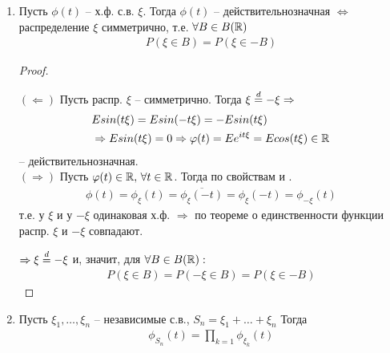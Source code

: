 \begin{enumerate}[label=\protect\circled{\arabic*},series=charfunc_properties]
    \begin{proof}
      \begin{align*}
        \phi(t) = E e^{i t \xi} = E e^{conj{-i t \xi}} = \conj{E e^{-i t \xi}} = \conj{\phi(-t)}
      \end{align*}
    \end{proof}

  \item
    Пусть $\phi(t)$ -- х.ф. с.в. $\xi$. 
    Тогда $\phi(t)$ -- действительнозначная $\Leftrightarrow$ распределение $\xi$ 
    симметрично, т.е. $\forall B \in B(\mathbb{R})$
    \begin{align*}
      P(\xi \in B) = P(\xi \in -B)
    \end{align*}

    \begin{proof}~

      $(\Leftarrow)$ Пусть распр. $\xi$ -- симметрично. 
      Тогда $\xi \stackrel{d}{=} -\xi \Rightarrow$
      \begin{align*}
        &E sin(t\xi) = E sin(-t\xi) = -E sin(t\xi)\\
        &\Rightarrow E sin(t\xi) = 0 \Rightarrow \varphi(t) = E e^{i t \xi} = E cos(t \xi) \in \mathbb{R}
      \end{align*}
      -- действительнозначная.\\

      $(\Rightarrow)$ Пусть $\varphi(t) \in \mathbb{R}, \, \forall t \in \mathbb{R}$.
      Тогда по свойствам  и .
      \begin{align*}
        \phi(t) = \phi_\xi (t) = \overline{\phi_\xi (-t)} = \phi_{\xi} (-t) = \phi_{-\xi} (t)
      \end{align*}
      т.е. у $\xi$ и у $-\xi$  одинаковая х.ф. 
      $\Rightarrow$ по теореме о единственности функции распр. $\xi$ и $-\xi$ совпадают.

      $\Rightarrow \xi \stackrel{d}{=} -\xi$ и, значит, для $\forall B \in B(\mathbb{R}):$
      \begin{align*}
        P(\xi \in B) = P(-\xi \in B) = P(\xi \in -B)
      \end{align*}
    \end{proof}

    \item
      Пусть $\xi_1, \ldots, \xi_n$ -- независимые с.в., $S_n = \xi_1 + \ldots + \xi_n$
      Тогда 
      \begin{align*}
        \phi_{S_n} (t) = \prod_{k = 1} \phi_{\xi_k} (t)
      \end{align*}


\end{enumerate}
